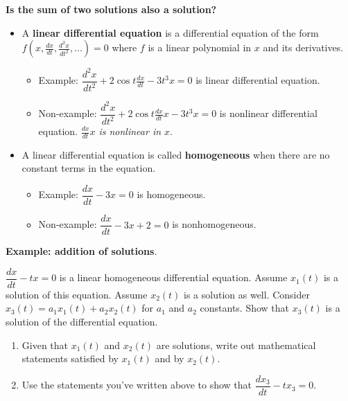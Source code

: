 \documentclass[12pt,letterpaper,noanswers]{exam}
\begin{document}
\noindent\textbf{Is the sum of two solutions also a solution?}
\begin{tcolorbox}
\begin{itemize}
\itemsep0em
    \item A \textbf{linear differential equation} is a differential equation of the form $f(x,\frac{dx}{dt}, \frac{d^2x}{dt^2}, ...) = 0$ where $f$ is a linear polynomial in $x$ and its derivatives.
    \begin{itemize}
        \itemsep0em
        \item Example: $\dfrac{d^2x}{dt^2} + 2\cos t \frac{dx}{dt} - 3t^3 x = 0$ is linear differential equation.
   \item  Non-example: $\dfrac{d^2x}{dt^2} + 2\cos t \frac{dx}{dt}x - 3t^3 x = 0$ is nonlinear differential equation.  \emph{$\frac{dx}{dt}x$ is nonlinear in $x$}.
    \end{itemize}
    \item A linear differential equation is called \textbf{homogeneous} when there are no constant terms in the equation.  
    \begin{itemize}
    \itemsep0em
        \item Example: $\dfrac{dx}{dt} - 3x = 0$ is homogeneous. 
   \item  Non-example: $\dfrac{dx}{dt} - 3x + 2 = 0$ is nonhomogeneous.
    \end{itemize}
\end{itemize}

\end{tcolorbox}

\noindent\textbf{Example: addition of solutions}.  

$\dfrac{dx}{dt} - t x = 0$ is a linear homogeneous differential equation.  Assume $x_1(t)$ is a solution of this equation.  Assume $x_2(t)$ is a solution as well.  Consider $x_3(t) = a_1x_1(t) + a_2x_2(t)$ for $a_1$ and $a_2$ constants.  Show that $x_3(t)$ is a solution of the differential equation.
\begin{enumerate}
    \item Given that $x_1(t)$ and $x_2(t)$ are solutions, write out mathematical statements satisfied by $x_1(t)$ and by $x_2(t)$.
    \vspace{1in}
    
    \item Use the statements you've written above to show that $\dfrac{d x_3}{dt} - t x_3 = 0$.
    \vspace{1in}
\end{enumerate}
\end{document}

